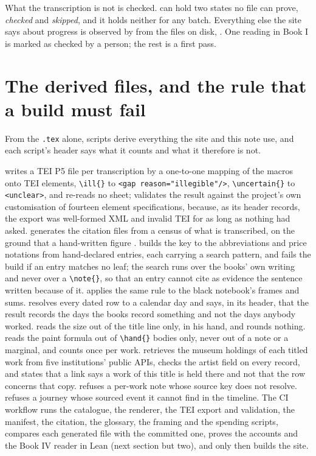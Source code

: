 What the transcription is not is checked.  can hold two states no file can prove, \emph{checked} and \emph{skipped}, and it holds neither for any batch. Everything else the site says about progress is observed by  from the files on disk, . One reading in Book I is marked as checked by a person; the rest is a first pass.

\section{The derived files, and the rule that a build must fail}

From the \texttt{.tex} alone, scripts derive everything the site and this note use, and each script's header says what it counts and what it therefore is not.

 writes a TEI P5 file per transcription by a one-to-one mapping of the macros onto TEI elements, \verb|\ill{}| to \texttt{<gap reason="illegible"/>}, \verb|\uncertain{}| to \texttt{<unclear>}, and re-reads no sheet;  validates the result against the project's own customisation of fourteen element specifications, because, as its header records, the export was well-formed XML and invalid TEI for as long as nothing had asked.  generates the citation files from a census of what is transcribed, on the ground that a hand-written figure .  builds the key to the abbreviations and price notations from hand-declared entries, each carrying a search pattern, and fails the build if an entry matches no leaf; the search runs over the books' own writing and never over a \verb|\note{}|, so that an entry cannot cite as evidence the sentence written because of it.  applies the same rule to the black notebook's frames and sums.  resolves every dated row to a calendar day and says, in its header, that the result records the days the books record something and not the days anybody worked.  reads the size out of the title line only, in his hand, and rounds nothing.  reads the paint formula out of \verb|\hand{}| bodies only, never out of a note or a marginal, and counts once per work.  retrieves the museum holdings of each titled work from five institutions' public APIs, checks the artist field on every record, and states that a link says a work of this title is held there and not that the row concerns that copy.  refuses a per-work note whose source key does not resolve.  refuses a journey whose sourced event it cannot find in the timeline. The CI workflow runs the catalogue, the renderer, the TEI export and validation, the manifest, the citation, the glossary, the framing and the spending scripts, compares each generated file with the committed one, proves the accounts and the Book IV reader in Lean (next section but two), and only then builds the site.

